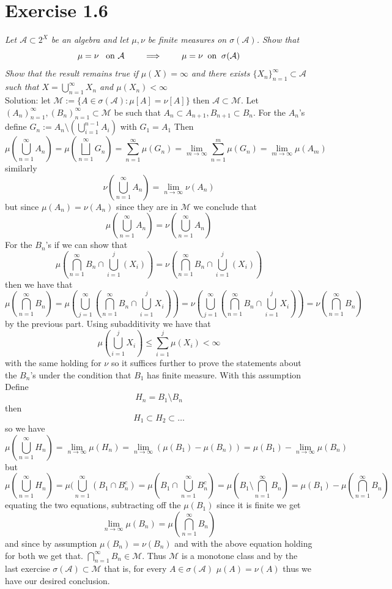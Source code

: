\documentclass[11pt]{article}
\newcommand{\solution}[1]{{{\textcolor{header}{Solution:} \textcolor{solution}{#1}}}}
\begin{document}
\section{Exercise 1.6}
\emph{
    Let $ \mathcal{A} \subset 2^{X}$ be an algebra and let $\mu, \nu$ be finite measures on $ \sigma ( \mathcal{A})$. Show that
    \[
        \mu = \nu \;\;\;\text{on $ \mathcal{A}$} \qquad \implies \qquad \mu = \nu \;\; \text{on} \;\; \sigma( \mathcal{A})
    \] 
    Show that the result remains true if $\mu(X) = \infty$ and there exists $\{X_n\}_{n=1}^{\infty} \subset \mathcal{A}$ such that
    $X = \bigcup_{n=1}^{\infty}X_n$ and $\mu(X_n) < \infty$
}\\
\solution{
    let $\mathcal{M} := \{A \in \sigma( \mathcal{A}) : \mu[A] = \nu[A]\}$ then
    $ \mathcal{A} \subset \mathcal{M}$. Let $(A_n)_{n=1}^{\infty}, (B_n)_{n=1}^{\infty} \subset \mathcal{M}$ be such that
    $A_n \subset A_{n+1}, B_{n+1} \subset B_n$. For the $A_n$'s define  $G_n := A_n \setminus (\bigcup_{i=1}^{n-1}A_i)$ with $G_1 = A_1$
    Then
    \[
        \mu(\bigcup_{n=1}^{\infty}A_n) = \mu(\bigsqcup_{n=1}^{\infty}G_n) = \sum_{n=1}^{\infty} \mu(G_n) = \lim_{m\to \infty} \sum_{n=1}^{m}\mu(G_n) = \lim_{m\to \infty}\mu(A_m)
    \] 
    similarly
    \[
        \nu(\bigcup_{n=1}^{\infty}A_n) = \lim_{n\to \infty}\nu(A_n)
    \] 
    but since $\mu(A_n) = \nu(A_n)$ since they are in $\mathcal{M}$ we conclude that
     \[
         \mu(\bigcup_{n=1}^{\infty}A_n) = \nu(\bigcup_{n=1}^{\infty}A_n)
    \] 
    For the $B_n$'s if we can show that
     \[
         \mu(\bigcap_{n=1}^{\infty}B_n \cap \bigcup_{i=1}^{j}(X_i)) = \nu(\bigcap_{n=1}^{\infty}B_n \cap \bigcup_{i=1}^{j}(X_i))
    \] 
    then we have that
    \[
        \mu(\bigcap_{n=1}^{\infty}B_n) = \mu(\bigcup_{j=1}^{\infty} (\bigcap_{n=1}^{\infty}B_n \cap \bigcup_{i=1}^{j}X_i)) = \nu(\bigcup_{j=1}^{\infty}(\bigcap_{n=1}^{\infty}B_n \cap \bigcup_{i=1}^{j}X_i)) = \nu(\bigcap_{n=1}^{\infty}B_n)
    \] 
    by the previous part. Using subadditivity we have that
    \[
        \mu(\bigcup_{i=1}^{j}X_i) \le \sum_{i=1}^{j}\mu(X_i) < \infty
    \] 
    with the same holding for $\nu$ so it suffices further to prove the statements about the  $B_n$'s under the condition that  $B_1$ has finite measure.
    With this assumption Define
    \[
    H_n = B_1 \setminus B_n
    \] 
    then
    \[
    H_1 \subset H_2 \subset \dots
    \] 
    so we have
    \[
        \mu(\bigcup_{n=1}^{\infty}H_n) = \lim_{n\to \infty}\mu(H_n) = \lim_{n\to \infty}(\mu(B_1) - \mu(B_n)) = \mu(B_1) - \lim_{n\to \infty}\mu(B_n)
    \] 
    but
    \[
        \mu(\bigcup_{n=1}^{\infty}H_n) = \mu(\bigcup_{n=1}^{\infty}(B_1 \cap B_n^{c}) = \mu(B_1 \cap \bigcup_{n=1}^{\infty}B_n^{c}) = \mu(B_1 \setminus \bigcap_{n=1}^{\infty}B_n) = \mu(B_1) - \mu(\bigcap_{n=1}^{\infty}B_n)
    \] 
    equating the two equations, subtracting off the $\mu(B_1)$ since it is finite we get
    \[
        \lim_{n\to \infty}\mu(B_n) = \mu(\bigcap_{n=1}^{\infty}B_n)
    \] 
    and since by assumption $\mu(B_n) = \nu(B_n)$ and with the above equation holding for both we get that.
    $\bigcap_{n=1}^{\infty}B_n \in \mathcal{M}$. Thus $\mathcal{M}$ is a monotone class and by the last exercise  $\sigma( \mathcal{A}) \subset \mathcal{M}$ that is, for every  $A \in \sigma( \mathcal{A})$ $\mu(A) = \nu(A)$ thus we have our desired conclusion.
}
\end{document}
